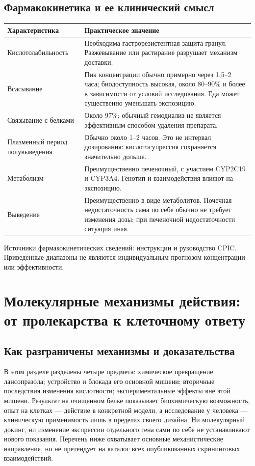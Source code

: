 \documentclass[11pt,a4paper,notitlepage]{report}
\newcommand{\src}[1]{\unskip\space\cite{#1}}
\begin{document}
\subsection{Фармакокинетика и ее клинический смысл}
\begin{longtable}{P{0.29\textwidth}P{0.64\textwidth}}
\toprule
Характеристика & Практическое значение \\
\midrule
\endhead
Кислотолабильность & Необходима гастрорезистентная защита гранул. Разжевывание или растирание разрушает механизм доставки. \\
Всасывание & Пик концентрации обычно примерно через 1,5--2 часа; биодоступность высокая, около 80--90\% и более в зависимости от условий исследования. Еда может существенно уменьшать экспозицию. \\
Связывание с белками & Около 97\%; обычный гемодиализ не является эффективным способом удаления препарата. \\
Плазменный период полувыведения & Обычно около 1--2 часов. Это не интервал дозирования: кислотосупрессия сохраняется значительно дольше. \\
Метаболизм & Преимущественно печеночный, с участием CYP2C19 и CYP3A4. Генотип и взаимодействия влияют на экспозицию. \\
Выведение & Преимущественно в виде метаболитов. Почечная недостаточность сама по себе обычно не требует изменения дозы; при печеночной недостаточности ситуация иная. \\
\bottomrule
\end{longtable}
Источники фармакокинетических сведений: инструкции и руководство CPIC. Приведенные диапазоны не являются индивидуальным прогнозом концентрации или эффективности.\src{pharmalabel,hpra,cpic}

\section{Молекулярные механизмы действия: от пролекарства к клеточному ответу}
\label{sec:molecular}

\subsection{Как разграничены механизмы и доказательства}
В этом разделе разделены четыре предмета: химическое превращение лансопразола; устройство и блокада его основной мишени; вторичные последствия изменения кислотности; экспериментальные эффекты вне этой мишени. Результат на очищенном белке показывает биохимическую возможность, опыт на клетках --- действие в конкретной модели, а исследование у человека --- клиническую применимость лишь в пределах своего дизайна. Ни молекулярный докинг, ни изменение экспрессии отдельного гена сами по себе не устанавливают нового показания. Перечень ниже охватывает основные механистические направления, но не претендует на каталог всех опубликованных скрининговых взаимодействий.
\end{document}
